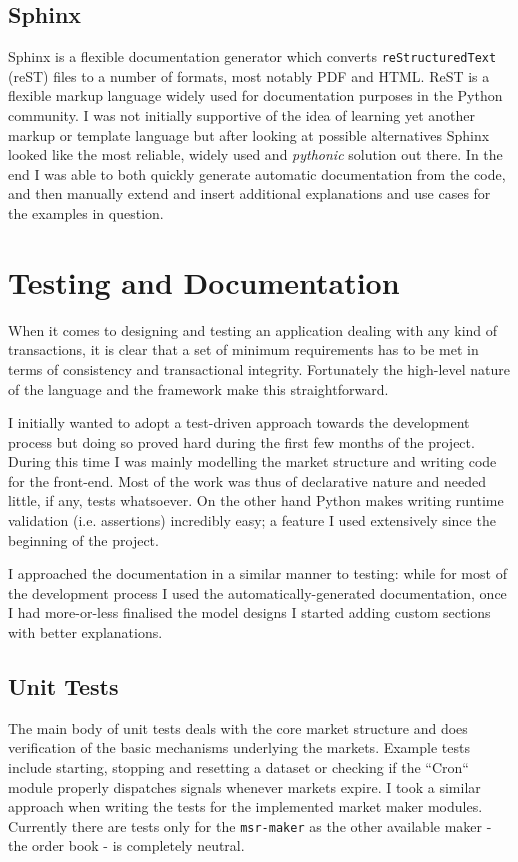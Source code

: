 \documentclass[bsc,frontabs,twoside,singlespacing,parskip,deptreport]{infthesis}     %
\begin{document}
\subsection{Sphinx}
    Sphinx is a flexible documentation generator which converts {\tt reStructuredText} (reST) files to a number of formats, most notably PDF and HTML. ReST is a flexible markup language widely used for documentation purposes in the Python community. I was not initially supportive of the idea of learning yet another markup or template language but after looking at possible alternatives Sphinx looked like the most reliable, widely used and {\em pythonic} solution out there. In the end I was able to both quickly generate automatic documentation from the code, and then manually extend and insert additional explanations and use cases for the examples in question.

\section{Testing and Documentation}
    When it comes to designing and testing an application dealing with any kind of transactions, it is clear that a set of minimum requirements has to be met in terms of consistency and transactional integrity. Fortunately the high-level nature of the language and the framework make this straightforward.

I initially wanted to adopt a test-driven approach towards the development process but doing so proved hard during  the first few months of the project. During this time I was mainly modelling the market structure and writing code for the front-end. Most of the work was thus of declarative nature and needed little, if any, tests whatsoever. On the other hand Python makes writing runtime validation (i.e. assertions) incredibly easy; a feature I used extensively since the beginning of the project. 

I approached the documentation in a similar manner to testing: while for most of the development process I used the automatically-generated documentation, once I had more-or-less finalised the model designs I started adding custom sections with better explanations. 

\subsection{Unit Tests}

    The main body of unit tests deals with the core market structure and does verification of the basic mechanisms underlying the markets. Example tests include starting, stopping and resetting a dataset or checking if the ``Cron`` module properly dispatches signals whenever markets expire. 
    I took a similar approach when writing the tests for the implemented market maker modules. Currently there are tests only for the {\tt msr-maker} as the other available maker - the order book - is completely neutral. 
    
\end{document}
